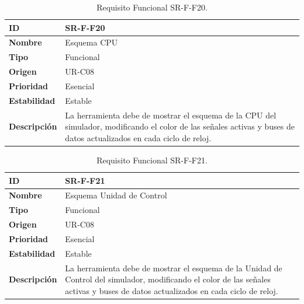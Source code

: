 \begin{center}
\begin{table}[htbp]
\centering
\begin{tabular}{@{}p{2.5cm} p{9cm}@{}} 
\toprule
\textbf{ID} 				& SR-F-F20 \\
\midrule
\textbf{Nombre} 			& Esquema CPU\\
\midrule
\textbf{Tipo} 			& Funcional \\
\midrule
\textbf{Origen} 			& UR-C08 \\
\midrule
\textbf{Prioridad}		& Esencial \\
\midrule
\textbf{Estabilidad} 		& Estable \\
\midrule
\textbf{Descripción} 	& La herramienta debe de mostrar el esquema de la CPU del simulador, modificando el color de las señales activas y buses de datos actualizados en cada ciclo de reloj. \\
\bottomrule
\end{tabular}
\caption{Requisito Funcional SR-F-F20.}
\label{tab:srff20}
\end{table}
\end{center}

\begin{center}
\begin{table}[htbp]
\centering
\begin{tabular}{@{}p{2.5cm} p{9cm}@{}} 
\toprule
\textbf{ID} 				& SR-F-F21 \\
\midrule
\textbf{Nombre} 			& Esquema Unidad de Control\\
\midrule
\textbf{Tipo} 			& Funcional \\
\midrule
\textbf{Origen} 			& UR-C08 \\
\midrule
\textbf{Prioridad}		& Esencial \\
\midrule
\textbf{Estabilidad} 		& Estable \\
\midrule
\textbf{Descripción} 	& La herramienta debe de mostrar el esquema de la Unidad de Control del simulador, modificando el color de las señales activas y buses de datos actualizados en cada ciclo de reloj. \\
\bottomrule
\end{tabular}
\caption{Requisito Funcional SR-F-F21.}
\label{tab:srff21}
\end{table}
\end{center}

